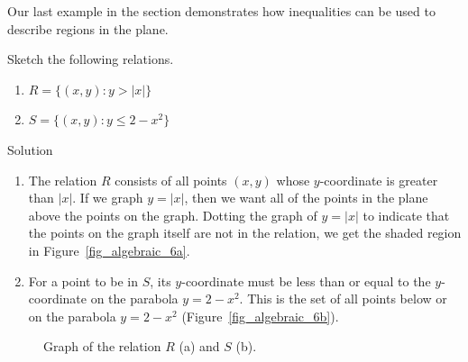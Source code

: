 Our last example in the section demonstrates how inequalities can be used to describe regions in the plane.

\begin{example}  
Sketch the following relations. 

\begin{multicols}{2}
\begin{enumerate}

\item $R = \{ (x,y) : y > |x| \}$

\item $S = \{ (x,y) :  y \leq 2-x^2 \}$


\end{enumerate}
\end{multicols}

Solution 

\begin{enumerate}

\item  The relation $R$ consists of all points $(x,y)$ whose $y$-coordinate is greater than $|x|$.  If we graph $y=|x|$, then we want all of the points in the plane above the points on the graph.  Dotting the graph of $y=|x|$ to indicate that the points on the graph itself are not in the relation, we get the shaded region in Figure~\ref{fig_algebraic_6a}.


\item  For a point to be in $S$, its $y$-coordinate must be less than or equal to the $y$-coordinate on the parabola $y=2-x^2$.  This is the set of all points below or on the parabola $y=2-x^2$ (Figure~\ref{fig_algebraic_6b}).


\end{enumerate}

\begin{figure}[H]
\centering
\centerline{
\hspace{0.1cm}
}
\caption{Graph of the relation $R$ (a) and $S$ (b). }
\end{figure}

\end{example}
\fi


